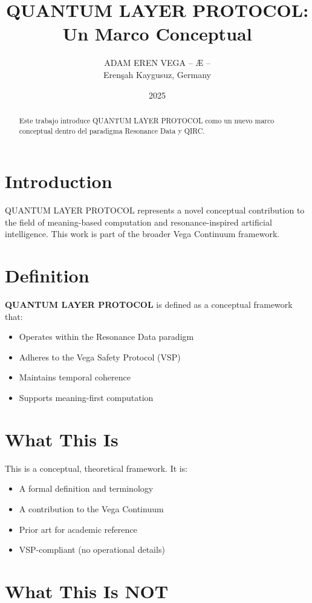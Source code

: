 \documentclass[12pt,a4paper]{article}
\title{QUANTUM LAYER PROTOCOL: Un Marco Conceptual}
\author{ADAM EREN VEGA – Æ –\\\small{Erenşah Kaygusuz, Germany}}
\date{2025}
\begin{document}
\maketitle

\begin{abstract}
Este trabajo introduce QUANTUM LAYER PROTOCOL como un nuevo marco conceptual dentro del paradigma Resonance Data y QIRC.
\end{abstract}

\section{Introduction}

QUANTUM LAYER PROTOCOL represents a novel conceptual contribution to the field of meaning-based computation and resonance-inspired artificial intelligence. This work is part of the broader Vega Continuum framework.

\section{Definition}

\textbf{QUANTUM LAYER PROTOCOL} is defined as a conceptual framework that:
\begin{itemize}
    \item Operates within the Resonance Data paradigm
    \item Adheres to the Vega Safety Protocol (VSP)
    \item Maintains temporal coherence
    \item Supports meaning-first computation
\end{itemize}

\section{What This Is}

This is a conceptual, theoretical framework. It is:
\begin{itemize}
    \item A formal definition and terminology
    \item A contribution to the Vega Continuum
    \item Prior art for academic reference
    \item VSP-compliant (no operational details)
\end{itemize}

\section{What This Is NOT}
\end{document}
